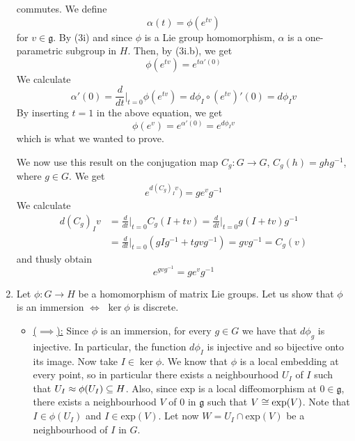 \documentclass[a4paper, 12pt]{article}
\begin{document}
\begin{Exercise}
\begin{enumerate}[label=(\roman*)]
            commutes.
            We define
            \[
                \alpha(t) = \phi(e^{tv})
            \]
            for $v \in \mathfrak{g}$.
            By (3i) and since $\phi$ is a Lie group homomorphism, $\alpha$ is a one-parametric subgroup in $H$.
            Then, by (3i.b), we get
            \[
                \phi(e^{tv}) = e^{t\alpha'(0)}
            \]
            We calculate
            \[
                \alpha'(0) = \frac{d}{dt}\Big|_{t=0}\phi(e^{tv}) = d\phi_I\circ (e^{tv})'(0) = d\phi_I v
            \]
            By inserting $t = 1$ in the above equation, we get
            \[
                \phi(e^{v}) = e^{\alpha'(0)} = e^{d\phi_Iv}
            \]
            which is what we wanted to prove.

            We now use this result on the conjugation map $C_g \colon G \to G$, $C_g(h) = ghg^{-1}$, where $g \in G$.
            We get
            \[
                e^{d(C_g)_Iv}) = ge^{v}g^{-1}
            \]
            We calculate
            \begin{align*}
                d(C_g)_I v &= \frac{d}{dt}\Big|_{t=0}C_g(I + tv) = \frac{d}{dt}\Big|_{t=0}g(I+tv)g^{-1} \\
                &= \frac{d}{dt}\Big|_{t=0}(gIg^{-1} + tgvg^{-1}) = gvg^{-1} = C_g(v)
            \end{align*}
            and thusly obtain
            \[
                e^{gvg^{-1}} = ge^{v}g^{-1}
            \]
        \item Let $\phi \colon G \to H$ be a homomorphism of matrix Lie groups.
            Let us show that $\phi$ is an immersion $\iff$ $\ker\phi$ is discrete.
            \begin{itemize}
                \item \underline{($\implies$):}
                    Since $\phi$ is an immersion, for every $g \in G$ we have that $d\phi_g$ is injective.
                    In particular, the function $d\phi_I$ is injective and so bijective onto its image.
                    Now take $I \in \ker\phi$.
                    We know that $\phi$ is a local embedding at every point,
                    so in particular there exists a neighbourhood $U_I$ of $I$ such that $U_I \approx \phi(U_I) \subseteq H$.
                    Also, since $\text{exp}$ is a local diffeomorphism at $0 \in \mathfrak{g}$,
                    there exists a neighbourhood $V$ of $0$ in $\mathfrak{g}$ such that $V \cong \text{exp}(V)$.
                    Note that $I \in \phi(U_I)$ and $I \in \text{exp}(V)$.
                    Let now $W = U_I \cap \text{exp}(V)$ be a neighbourhood of $I$ in $G$.


\end{itemize}
\end{enumerate}
\end{Exercise}
\end{document}
